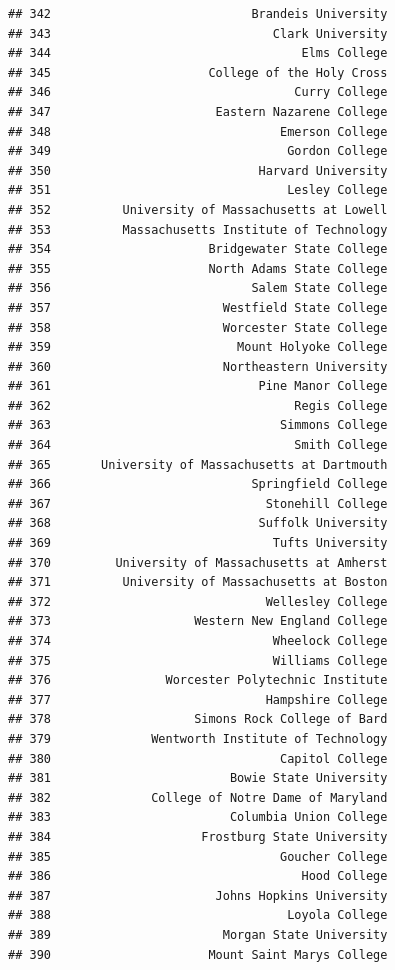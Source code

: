 \documentclass[]{article}
\begin{document}
\begin{verbatim}
## 342                            Brandeis University
## 343                               Clark University
## 344                                   Elms College
## 345                      College of the Holy Cross
## 346                                  Curry College
## 347                       Eastern Nazarene College
## 348                                Emerson College
## 349                                 Gordon College
## 350                             Harvard University
## 351                                 Lesley College
## 352          University of Massachusetts at Lowell
## 353          Massachusetts Institute of Technology
## 354                      Bridgewater State College
## 355                      North Adams State College
## 356                            Salem State College
## 357                        Westfield State College
## 358                        Worcester State College
## 359                          Mount Holyoke College
## 360                        Northeastern University
## 361                             Pine Manor College
## 362                                  Regis College
## 363                                Simmons College
## 364                                  Smith College
## 365       University of Massachusetts at Dartmouth
## 366                            Springfield College
## 367                              Stonehill College
## 368                             Suffolk University
## 369                               Tufts University
## 370         University of Massachusetts at Amherst
## 371          University of Massachusetts at Boston
## 372                              Wellesley College
## 373                    Western New England College
## 374                               Wheelock College
## 375                               Williams College
## 376                Worcester Polytechnic Institute
## 377                              Hampshire College
## 378                    Simons Rock College of Bard
## 379              Wentworth Institute of Technology
## 380                                Capitol College
## 381                         Bowie State University
## 382              College of Notre Dame of Maryland
## 383                         Columbia Union College
## 384                     Frostburg State University
## 385                                Goucher College
## 386                                   Hood College
## 387                       Johns Hopkins University
## 388                                 Loyola College
## 389                        Morgan State University
## 390                      Mount Saint Marys College

\end{verbatim}
\end{document}

